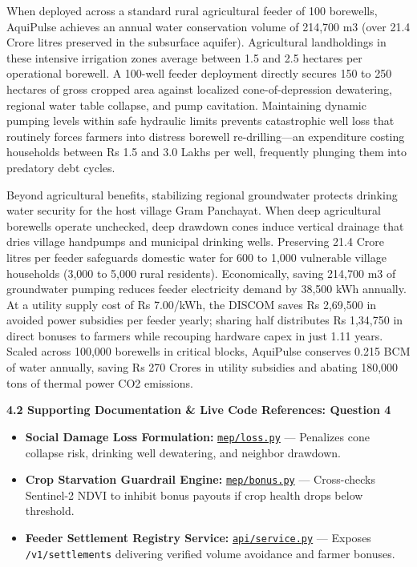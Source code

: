 \documentclass[10pt,a4paper]{article}
\begin{document}
When deployed across a standard rural agricultural feeder of 100 borewells, AquiPulse achieves an annual water conservation volume of 214,700 m3 (over 21.4 Crore litres preserved in the subsurface aquifer). Agricultural landholdings in these intensive irrigation zones average between 1.5 and 2.5 hectares per operational borewell. A 100-well feeder deployment directly secures 150 to 250 hectares of gross cropped area against localized cone-of-depression dewatering, regional water table collapse, and pump cavitation. Maintaining dynamic pumping levels within safe hydraulic limits prevents catastrophic well loss that routinely forces farmers into distress borewell re-drilling—an expenditure costing households between Rs 1.5 and 3.0 Lakhs per well, frequently plunging them into predatory debt cycles.

Beyond agricultural benefits, stabilizing regional groundwater protects drinking water security for the host village Gram Panchayat. When deep agricultural borewells operate unchecked, deep drawdown cones induce vertical drainage that dries village handpumps and municipal drinking wells. Preserving 21.4 Crore litres per feeder safeguards domestic water for 600 to 1,000 vulnerable village households (3,000 to 5,000 rural residents). Economically, saving 214,700 m3 of groundwater pumping reduces feeder electricity demand by 38,500 kWh annually. At a utility supply cost of Rs 7.00/kWh, the DISCOM saves Rs 2,69,500 in avoided power subsidies per feeder yearly; sharing half distributes Rs 1,34,750 in direct bonuses to farmers while recouping hardware capex in just 1.11 years. Scaled across 100,000 borewells in critical blocks, AquiPulse conserves 0.215 BCM of water annually, saving Rs 270 Crores in utility subsidies and abating 180,000 tons of thermal power CO2 emissions.

{\small \textbf{\color{secondary}4.2 Supporting Documentation \& Live Code References: Question 4}}
\begin{itemize}[leftmargin=1.5em, itemsep=1pt]
    \item \textbf{Social Damage Loss Formulation:} \href{https://github.com/HirthikBalaji/AquiPulse/blob/main/mep/loss.py}{\texttt{mep/loss.py}} --- Penalizes cone collapse risk, drinking well dewatering, and neighbor drawdown.
    \item \textbf{Crop Starvation Guardrail Engine:} \href{https://github.com/HirthikBalaji/AquiPulse/blob/main/mep/bonus.py}{\texttt{mep/bonus.py}} --- Cross-checks Sentinel-2 NDVI to inhibit bonus payouts if crop health drops below threshold.
    \item \textbf{Feeder Settlement Registry Service:} \href{https://github.com/HirthikBalaji/AquiPulse/blob/main/api/service.py}{\texttt{api/service.py}} --- Exposes \texttt{/v1/settlements} delivering verified volume avoidance and farmer bonuses.
\end{itemize}
\end{document}
